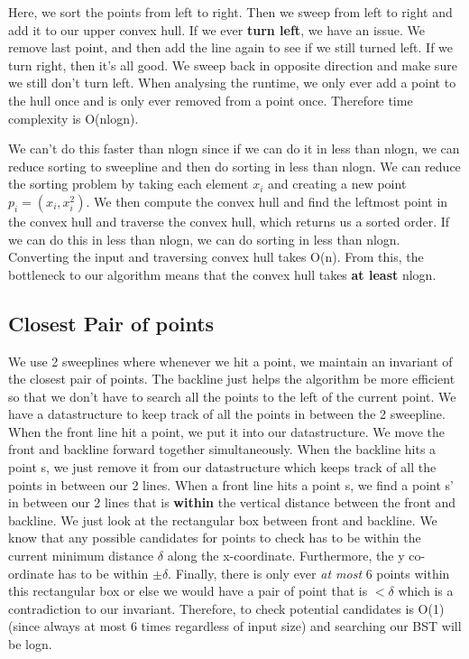 \documentclass[11pt, oneside]{article}
\theoremstyle{definition}
\begin{document}
Here, we sort the points from left to right. Then we sweep from left to right and add it to our upper convex hull. If we ever \textbf{turn left}, we have an issue. We remove last point, and then add the line again to see if we still turned left. If we turn right, then it's all good. We sweep back in opposite direction and make sure we still don't turn left. When analysing the runtime, we only ever add a point to the hull once and is only ever removed from a point once. Therefore time complexity is O(nlogn).

We can't do this faster than nlogn since if we can do it in less than nlogn, we can reduce sorting to sweepline and then do sorting in less than nlogn. We can reduce the sorting problem by taking each element $x_i$ and creating a new point $p_i = (x_i,x_i^2)$. We then compute the convex hull and find the leftmost point in the convex hull and traverse the convex hull, which returns us a sorted order. If we can do this in less than nlogn, we can do sorting in less than nlogn. Converting the input and traversing convex hull takes O(n). From this, the bottleneck to our algorithm means that the convex hull takes \textbf{at least} nlogn.

\subsection{Closest Pair of points}
We use 2 sweeplines where whenever we hit a point, we maintain an invariant of the closest pair of points. The backline just helps the algorithm be more efficient so that we don't have to search all the points to the left of the current point. We have a datastructure to keep track of all the points in between the 2 sweepline. When the front line hit a point, we put it into our datastructure. We move the front and backline forward together simultaneously. When the backline hits a point s, we just remove it from our datastructure which keeps track of all the points in between our 2 lines. When a front line hits a point s, we find a point s' in between our 2 lines that is \textbf{within} the vertical distance between the front and backline. We just look at the rectangular box between front and backline. We know that any possible candidates for points to check has to be within the current minimum distance $\delta$ along the x-coordinate. Furthermore, the y co-ordinate has to be within $\pm \delta$. Finally, there is only ever \textit{at most} 6 points within this rectangular box or else we would have a pair of point that is $< \delta$ which is a contradiction to our invariant. Therefore, to check potential candidates is O(1) (since always at most 6 times regardless of input size) and searching our BST will be logn.
\end{document}
